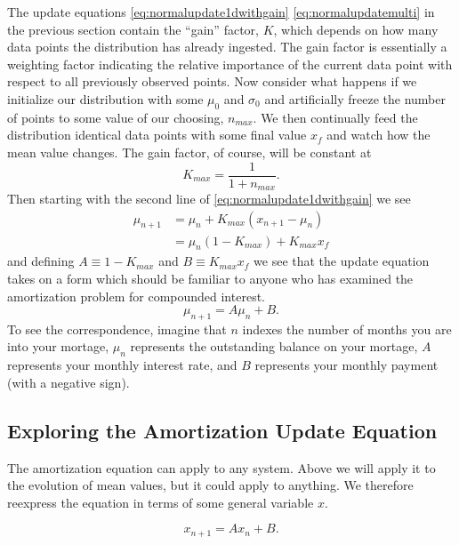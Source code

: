 \documentclass[../../main.tex]{subfiles}
\begin{document}
The update equations \eqref{eq:normalupdate1dwithgain}
\eqref{eq:normalupdatemulti} in the previous section contain the ``gain''
factor, $K$, which depends on how many data points the distribution has already
ingested.  The gain factor is essentially a weighting factor indicating the
relative importance of the current data point with respect to all previously
observed points.  Now consider what happens if we initialize our distribution
with some $\mu_0$ and $\sigma_0$ and artificially freeze the number of points to
some value of our choosing, $n_{max}$.  We then continually feed the
distribution identical data points with some final value $x_f$ and watch how
the mean value changes.  The gain factor, of course, will be constant at
\begin{equation}
    \label{eq:kconst}
    K_{max} = \frac{1}{1 + n_{max}}.
\end{equation}
Then starting with the second line of
\eqref{eq:normalupdate1dwithgain} we see
\begin{align}
    \label{eq:interest}
    \mu_{n+1} &= \mu_n  + K_{max} \left( x_{n+1} - \mu_n \right)\nonumber\\
              &= \mu_n (1 - K_{max}) + K_{max}x_f
\end{align}
and defining $A \equiv 1-K_{max}$ and $B \equiv K_{max} x_f$
we see that the update equation takes on a form which should be familiar to
anyone who has examined the amortization problem for compounded interest.
\begin{equation}
    \label{eq:interest}
    \mu_{n+1} = A \mu_n + B.
\end{equation}
To see the correspondence, imagine that $n$ indexes the number of months you
are into your mortage, $\mu_n$ represents the outstanding balance on your
mortage, $A$ represents your monthly interest rate, and $B$ represents your
monthly payment (with a negative sign). 

\subsection{Exploring the Amortization Update Equation}
The amortization equation can apply to any system.  Above we will apply it to
the evolution of mean values, but it could apply to anything.  We therefore
reexpress the equation in terms of some general variable $x$.

\begin{equation}
    \label{eq:amortize}
    x_{n+1} = A x_n + B.
\end{equation}
\end{document}
